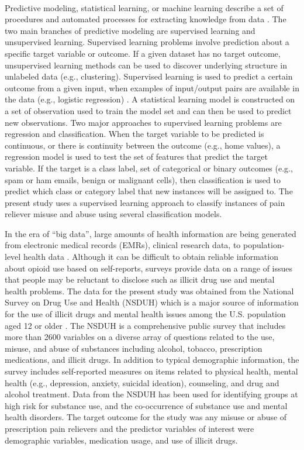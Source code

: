 \\\documentclass[sigconf]{acmart}
\begin{document}
Predictive modeling, statistical learning, or machine learning describe a 
set of procedures and automated processes for extracting knowledge from data 
\cite{james13, kuhn13, muller17, raschka17}. The two main branches of 
predictive modeling are supervised learning and unsupervised learning. 
Supervised learning problems involve prediction about a specific target 
variable or outcome. If a given dataset has no target outcome, unsupervised 
learning methods can be used to discover underlying structure in unlabeled data 
(e.g., clustering). Supervised learning is used to predict a certain outcome 
from a given input, when examples of input/output pairs are available in the 
data (e.g., logistic regression) \cite{muller17}. A statistical learning model 
is constructed on a set of observation used to train the model set and can then 
be used to predict new observations. Two major approaches to supervised learning 
problems are regression and classification. When the target variable to be 
predicted is continuous, or there is continuity between the outcome 
(e.g., home values), a regression model is used to test the set of features 
that predict the target variable. If the target is a class label, set of 
categorical or binary outcomes (e.g., spam or ham emails, benign or malignant 
cells), then classification is used to predict which class or category label 
that new instances will be assigned to. The present study uses a supervised 
learning approach to classify instances of pain reliever misuse and abuse 
using several classification models. 


In the era of ``big data'', large amounts of health information are being 
generated from electronic medical records (EMRs), clinical research data, to 
population-level health data \cite{herland14}. Although it can be difficult 
to obtain reliable information about opioid use based on self-reports, surveys 
provide data on a range of issues that people may be reluctant to disclose 
such as illicit drug use and mental health problems. The data for the present 
study was obtained from the National Survey on Drug Use and Health (NSDUH) 
which is a major source of information for the use of illicit drugs and mental 
health issues among the U.S. population aged 12 or older \cite{samhsa18}. 
The NSDUH is a comprehensive public survey that includes more than 2600 
variables on a diverse array of questions related to the use, misuse, and 
abuse of substances including alcohol, tobacco, prescription medications, and 
illicit drugs. In addition to typical demographic information, the survey
includes self-reported measures on items related to physical health, mental 
health (e.g., depression, anxiety, suicidal ideation), counseling, and drug 
and alcohol treatment. Data from the NSDUH has been used for identifying 
groups at high risk for substance use, and the co-occurrence of substance 
use and mental health disorders. The target outcome for the study was any 
misuse or abuse of prescription pain relievers and the predictor variables of 
interest were demographic variables, medication usage, and use of illicit drugs. 
\end{document}

